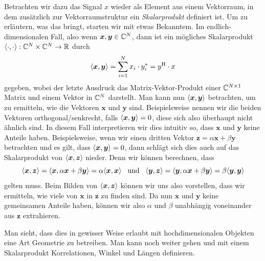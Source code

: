 Betrachten wir dazu das Signal $x$ wieder als Element aus einem Vektorraum, in dem zusätzlich zur Vektorraumstruktur ein \emph{Skalarprodukt} definiert ist.
Um zu erläutern, was das bringt, starten wir mit etwas Bekanntem.
Im endlich-dimensionalen Fall, also wenn $\bm x, \bm y \in \mathbb{C}^N$, dann ist ein mögliches Skalarprodukt ${\left\langle \cdot,\cdot \right\rangle} : \mathbb{C}^N \times \mathbb{C}^N \rightarrow \mathbb{R}$ durch
\[
 {\left\langle \bm x,\bm y \right\rangle} 
    = {\sum\limits_{i = 1}^{N}{x_i \cdot y^\ast_i}} 
    = y^{\mathrm{H}} \cdot x
\]
gegeben, wobei der letzte Ausdruck das Matrix-Vektor-Produkt einer $\mathbb{C}^{N \times 1}$ Matrix und einem Vektor in $\mathbb{C}^N$ darstellt.
Man kann nun ${\left\langle \bm x,\bm y \right\rangle}$ betrachten, um zu ermitteln, wie  die Vektoren $\bm x$ und $\bm y$ sind.
Beispielsweise nennen wir die beiden Vektoren orthogonal/senkrecht, falls ${\left\langle \bm x,\bm y \right\rangle} = 0$, diese sich also überhaupt nicht ähnlich sind. 
In diesem Fall interpretieren wir dies intuitiv so, dass $\bm x$ und $\bm y$ keine  Anteile haben.
Beispielsweise, wenn wir einen dritten Vektor $\bm z = \alpha \bm x + \beta \bm y$ betrachten und es gilt, dass ${\left\langle \bm x,\bm y \right\rangle} = 0$, dann schlägt sich dies auch auf das Skalarprodukt von ${\left\langle \bm x,\bm z \right\rangle}$ nieder. 
Denn wir können berechnen, dass
%
\[
    {\left\langle \bm x,\bm z \right\rangle} 
        = {\left\langle \bm x,\alpha \bm x + \beta \bm y \right\rangle}
        = \alpha {\left\langle \bm x,\bm x \right\rangle}
    {\hspace{3mm} \text{und} \hspace{3mm}}
    {\left\langle \bm y,\bm z \right\rangle} 
        = {\left\langle \bm y,\alpha \bm x + \beta \bm y \right\rangle}
        = \beta {\left\langle \bm y,\bm y \right\rangle}
\]
%
gelten muss.
Beim Bilden von ${\left\langle \bm x,\bm z \right\rangle}$ können wir uns also vorstellen, dass wir ermitteln, wie viele  von $\bm x$ in $\bm z$ zu finden sind.
Da nun $\bm x$ und $\bm y$ keine gemeinsamen Anteile haben, können wir also $\alpha$ und $\beta$ unabhängig voneinander aus $\bm z$ extrahieren.

Man sieht, dass dies in gewisser Weise erlaubt mit hochdimensionalen Objekten eine Art Geometrie zu betreiben.
Man kann noch weiter gehen und mit einem Skalarprodukt Korrelationen, Winkel und Längen definieren.

